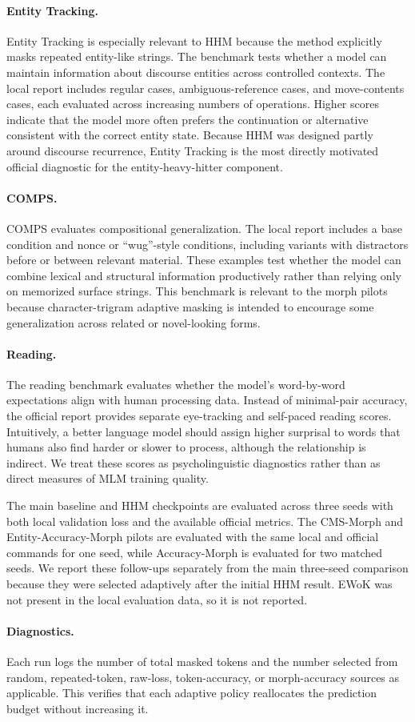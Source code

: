 \paragraph{Entity Tracking.}
Entity Tracking is especially relevant to HHM because the method explicitly masks repeated entity-like strings. The benchmark tests whether a model can maintain information about discourse entities across controlled contexts. The local report includes regular cases, ambiguous-reference cases, and move-contents cases, each evaluated across increasing numbers of operations. Higher scores indicate that the model more often prefers the continuation or alternative consistent with the correct entity state. Because HHM was designed partly around discourse recurrence, Entity Tracking is the most directly motivated official diagnostic for the entity-heavy-hitter component.

\paragraph{COMPS.}
COMPS evaluates compositional generalization. The local report includes a base condition and nonce or ``wug''-style conditions, including variants with distractors before or between relevant material. These examples test whether the model can combine lexical and structural information productively rather than relying only on memorized surface strings. This benchmark is relevant to the morph pilots because character-trigram adaptive masking is intended to encourage some generalization across related or novel-looking forms.

\paragraph{Reading.}
The reading benchmark evaluates whether the model's word-by-word expectations align with human processing data. Instead of minimal-pair accuracy, the official report provides separate eye-tracking and self-paced reading scores. Intuitively, a better language model should assign higher surprisal to words that humans also find harder or slower to process, although the relationship is indirect. We treat these scores as psycholinguistic diagnostics rather than as direct measures of MLM training quality.

The main baseline and HHM checkpoints are evaluated across three seeds with both local validation loss and the available official metrics. The CMS-Morph and Entity-Accuracy-Morph pilots are evaluated with the same local and official commands for one seed, while Accuracy-Morph is evaluated for two matched seeds. We report these follow-ups separately from the main three-seed comparison because they were selected adaptively after the initial HHM result. EWoK was not present in the local evaluation data, so it is not reported.

\paragraph{Diagnostics.}
Each run logs the number of total masked tokens and the number selected from random, repeated-token, raw-loss, token-accuracy, or morph-accuracy sources as applicable. This verifies that each adaptive policy reallocates the prediction budget without increasing it.
